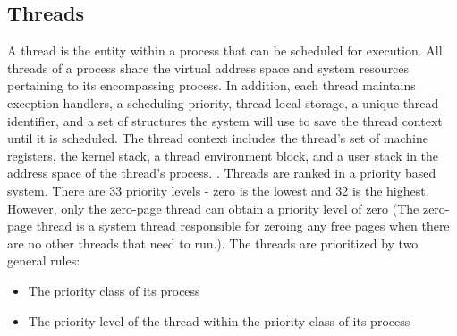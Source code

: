 \documentclass[onecolumn,draftclsnofoot, 10pt, compsoc]{IEEEtran}
\begin{document}
\subsection{Threads}
	 A thread is the entity within a process that can be scheduled for execution. 
	 All threads of a process share the virtual address space and system resources pertaining to its encompassing process. In addition, each thread maintains exception handlers, a scheduling priority, thread local storage, a unique thread identifier, and a set of structures the system will use to save the thread context until it is scheduled. The thread context includes the thread's set of machine registers, the kernel stack, a thread environment block, and a user stack in the address space of the thread's process. \cite{windowsProcessMSDN}.
	Threads are ranked in a priority based system. 
	There are 33 priority levels - zero is the lowest and 32 is the highest. 
	However, only the zero-page thread can obtain a priority level of zero (The zero-page thread is a system thread responsible for zeroing any free pages when there are no other threads that need to run.).
	The threads are prioritized by two general rules:
	\begin{itemize}
		\item The priority class of its process
		\item The priority level of the thread within the priority class of its process
	\end{itemize}
	
	
\end{document}
